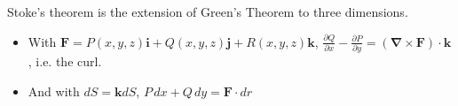 \begin{paracol}{2}

Stoke's theorem is the extension of Green's Theorem to three dimensions.

\begin{itemize}
    \item With $\mathbf{F} = P(x, y, z) \mathbf{i} + Q(x, y, z) \mathbf{j} + R(x, y, z) \mathbf{k}$, $\frac{\partial Q}{\partial x} - \frac{\partial P}{\partial y} = (\mathbf{\nabla} \times \mathbf{F}) \cdot \mathbf{k}$, i.e. the curl.

    \item And with $dS = \mathbf{k} dS$, $P \, dx + Q \, dy = \mathbf{F} \cdot dr$
\end{itemize}

\end{paracol}
